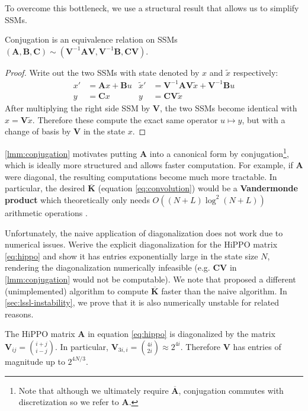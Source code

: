 To overcome this bottleneck, we use a structural result that allows us to simplify SSMs.
\begin{lemma}%
  \label{lmm:conjugation}
  Conjugation is an equivalence relation on SSMs \small \( (\bm{A}, \bm{B}, \bm{C}) \sim (\bm{V}^{-1} \bm{A} \bm{V}, \bm{V}^{-1}\bm{B}, \bm{C}\bm{V}) \).
\end{lemma}
\begin{proof}%
  Write out the two SSMs with state denoted by \( x \) and \( \tilde{x} \) respectively:
  \begin{align*}
    x' &= \bm{A}x + \bm{B}u & \tilde{x}' &= \bm{V}^{-1}\bm{A}\bm{V}\tilde{x} + \bm{V}^{-1}\bm{B}u \\
    y &= \bm{C}x & y &= \bm{C}\bm{V}\tilde{x}
  \end{align*}
  After multiplying the right side SSM by \( \bm{V} \), the two SSMs become identical with \( x = \bm{V}\tilde{x} \).
  Therefore these compute the exact same operator \( u \mapsto y \), but with a change of basis by \( \bm{V} \) in the state \( x \).
\end{proof}

\cref{lmm:conjugation} motivates putting \( \bm{A} \) into a canonical form by conjugation\footnote{Note that although we ultimately require \( \bm{\overline{A}} \), conjugation commutes with discretization so we refer to \( \bm{A} \).}, which is ideally more structured and allows faster computation.
For example, if \( \bm{A} \) were diagonal, the resulting computations become much more tractable.
In particular, the desired \( \bm{\overline{K}} \) (equation \eqref{eq:convolution}) would be a \textbf{Vandermonde product} which theoretically only needs \( O((N+L)\log^2(N+L)) \) arithmetic operations \citep{pan2001structured}.

Unfortunately, the naive application of diagonalization does not work due to numerical issues.
Werive the explicit diagonalization for the HiPPO matrix \eqref{eq:hippo} and show it has entries exponentially large in the state size \( N \), rendering the diagonalization numerically infeasible (e.g. \( \bm{C}\bm{V} \) in \cref{lmm:conjugation} would not be computable).
We note that \citet{gu2021lssl} proposed a different (unimplemented) algorithm to compute \( \bm{\overline{K}} \) faster than the naive algorithm.
In \cref{sec:lssl-instability}, we prove that it is also numerically unstable for related reasons.
\begin{lemma}%
  \label{lmm:hippo-diagonalization}
  The HiPPO matrix \( \bm{A} \) in equation \eqref{eq:hippo} is diagonalized by the matrix \( \bm{V}_{ij} = \binom{i+j}{i-j} \).
  In particular, \( \bm{V}_{3i,i} = \binom{4i}{2i} \approx 2^{4i} \).
  Therefore \( \bm{V} \) has entries of magnitude up to \( 2^{4N / 3} \).
\end{lemma}

